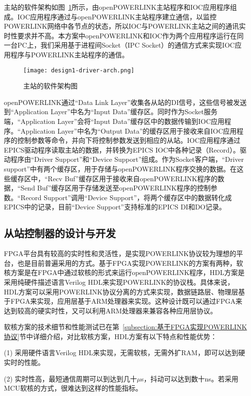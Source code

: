 主站的软件架构如图~\ref{fig:design1-driver-arch}所示，由openPOWERLINK主站程序和IOC应用程序组成。IOC应用程序通过与openPOWERLINK主站程序建立通信，以监控POWERLINK网络中各节点的状态，所以IOC与POWERLINK主站之间的通讯实时性要求并不高。本方案中openPOWERLINK和IOC作为两个应用程序运行在同一台PC上，我们采用基于进程间Socket（IPC Socket）的通信方式来实现IOC应用程序与POWERLINK主站程序的通信。

\begin{figure}[!htb]
  \centering
  \texttt{[image: design1-driver-arch.png]}
  \caption{主站的软件架构图}
  \label{fig:design1-driver-arch}
\end{figure}

openPOWERLINK通过“Data Link Layer”收集各从站的DI信号，这些信号被发送到“Application Layer”中名为“Input Data”缓存区。同时作为Socket服务端，“Application Layer”会将“Input Data”缓存区中的数据传输到IOC应用程序。“Application Layer”中名为“Output Data”的缓存区用于接收来自IOC应用程序的控制参数等命令，并向下将控制参数发送到相应的从站。IOC应用程序通过EPICS驱动程序读取主站的数据，并转换为EPICS IOC中各种记录（Record）。驱动程序由“Driver Support”和“Device Support”组成。作为Socket客户端，“Driver support”中有两个缓存区，用于存储与openPOWERLINK程序交换的数据。在这些缓存区中，“Recv Buf”缓存区用于接收来自openPOWERLINK程序的数据，“Send Buf”缓存区用于存储发送至openPOWERLINK程序的控制参数。“Record Support”调用“Device Support”，将两个缓存区中的数据转化成EPICS中的记录，目前“Device Support”支持标准的EPICS DI和DO记录。

\subsection{从站控制器的设计与开发}
\label{subsection:前端控制器的设计与开发}
FPGA平台具有较高的实时性和灵活性，是实现POWERLINK协议较为理想的平台，也是目前普遍采用的方式。基于FPGA实现POWERLINK的方案有两种，软核方案是在FPGA中通过软核的形式来运行openPOWERLINK程序，HDL方案是采用纯硬件描述语言Verilog HDL来实现POWERLINK的协议栈。具体来说，HDL方案可以采用POWERLINK协议分离的方式来实现，数据链路层、物理层基于FPGA来实现，应用层基于ARM处理器来实现。这种设计既可以通过FPGA来达到较高的硬实时性，又可以利用ARM处理器来兼容各种应用层协议。

软核方案的技术细节和性能测试已在第~\ref{subsection:基于FPGA实现POWERLINK协议}节中详细介绍，对比软核方案，HDL方案有以下特点和性能优势：

(1) 采用硬件语言Verilog HDL来实现，无需软核，无需外扩RAM，即可以达到硬实时的性能。

(2) 实时性高，最短通信周期可以到达到几十$\mu$s，抖动可以达到数十ns。若采用MCU软核的方式，很难达到这样的性能指标。

